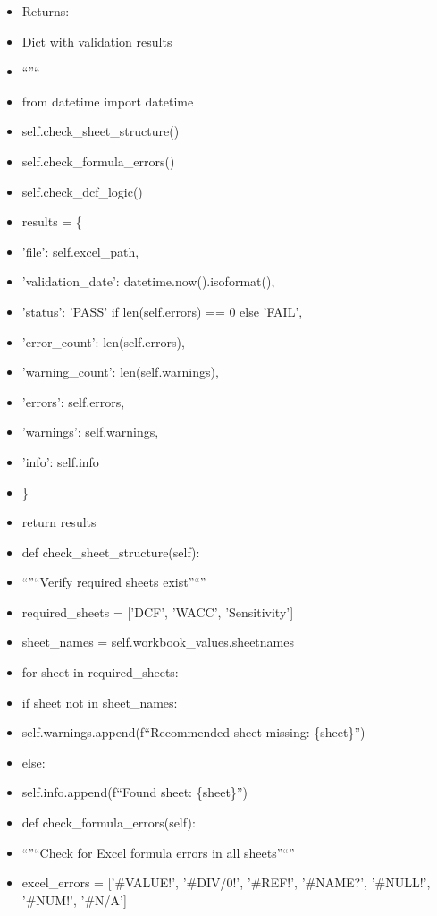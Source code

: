 \documentclass[11pt]{article}
\begin{document}
\begin{itemize}[leftmargin=*,itemsep=2pt,topsep=2pt]
\item {} Returns:
\item {} Dict with validation results
\item {} ``''``
\item {} from datetime import datetime
\item {} self.check\_\allowbreak{}sheet\_\allowbreak{}structure()
\item {} self.check\_\allowbreak{}formula\_\allowbreak{}errors()
\item {} self.check\_\allowbreak{}dcf\_\allowbreak{}logic()
\item {} results = \{
\item {} 'file': self.excel\_\allowbreak{}path,
\item {} 'validation\_\allowbreak{}date': datetime.now().isoformat(),
\item {} 'status': 'PASS' if len(self.errors) == 0 else 'FAIL',
\item {} 'error\_\allowbreak{}count': len(self.errors),
\item {} 'warning\_\allowbreak{}count': len(self.warnings),
\item {} 'errors': self.errors,
\item {} 'warnings': self.warnings,
\item {} 'info': self.info
\item {} \}
\item {} return results
\item {} def check\_\allowbreak{}sheet\_\allowbreak{}structure(self):
\item {} ``''``Verify required sheets exist''``''
\item {} required\_\allowbreak{}sheets = ['DCF', 'WACC', 'Sensitivity']
\item {} sheet\_\allowbreak{}names = self.workbook\_\allowbreak{}values.sheetnames
\item {} for sheet in required\_\allowbreak{}sheets:
\item {} if sheet not in sheet\_\allowbreak{}names:
\item {} self.warnings.append(f``Recommended sheet missing: \{sheet\}'')
\item {} else:
\item {} self.info.append(f``Found sheet: \{sheet\}'')
\item {} def check\_\allowbreak{}formula\_\allowbreak{}errors(self):
\item {} ``''``Check for Excel formula errors in all sheets''``''
\item {} excel\_\allowbreak{}errors = ['\#VALUE!', '\#DIV/0!', '\#REF!', '\#NAME?', '\#NULL!', '\#NUM!', '\#N/A']

\end{itemize}
\end{document}
